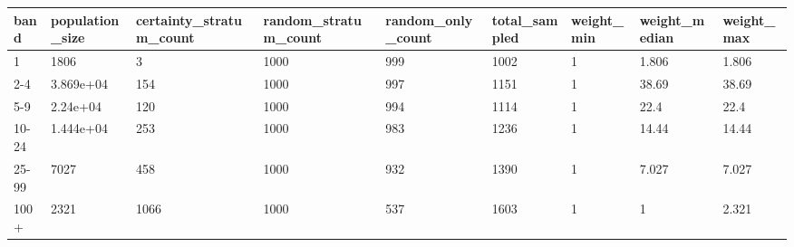 \begin{tabular}{lllllllll}
\toprule
band & population\_size & certainty\_stratum\_count & random\_stratum\_count & random\_only\_count & total\_sampled & weight\_min & weight\_median & weight\_max \\
\midrule
1 & 1806 & 3 & 1000 & 999 & 1002 & 1 & 1.806 & 1.806 \\
2-4 & 3.869e+04 & 154 & 1000 & 997 & 1151 & 1 & 38.69 & 38.69 \\
5-9 & 2.24e+04 & 120 & 1000 & 994 & 1114 & 1 & 22.4 & 22.4 \\
10-24 & 1.444e+04 & 253 & 1000 & 983 & 1236 & 1 & 14.44 & 14.44 \\
25-99 & 7027 & 458 & 1000 & 932 & 1390 & 1 & 7.027 & 7.027 \\
100+ & 2321 & 1066 & 1000 & 537 & 1603 & 1 & 1 & 2.321 \\
\bottomrule
\end{tabular}
